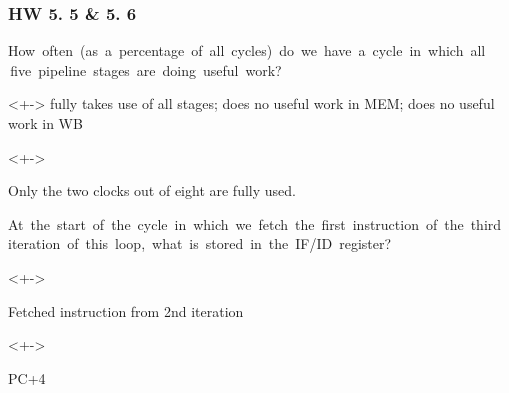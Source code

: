 \documentclass[xcolor=table]{beamer}
\begin{document}
\begin{mdframe}%

\frametitle{HW 5. 5 \& 5. 6}\label{heading-sec-hw-5-5-5-6}%

\noindent{} How  often  (as  a  percentage  of  all  cycles)  do  we  have  a  cycle  in  which  all  five  pipeline  stages  are  doing  useful  work?%

\mdhr{}%

\begin{onlyenv}<+->%
\noindent{} fully takes use of all stages;  does no useful work in MEM;  does no useful work in WB%
\end{onlyenv}%

\begin{onlyenv}<+->%
\begin{mdbmargintb}{}{}%
Only the two clocks out of eight are fully used.%
\end{mdbmargintb}%
\end{onlyenv}%

 At  the  start  of  the  cycle  in  which  we  fetch  the  first  instruction  of  the  third  iteration  of  this  loop,  what  is  stored  in  the  IF/ID  register?%

\mdhr{}%

\begin{itemize}[noitemsep,topsep=\mdcompacttopsep]%

\begin{onlyenv}<+->%
\item{}Fetched instruction from 2nd iteration 
\end{onlyenv}%

\begin{onlyenv}<+->%
\item{}PC+4
\end{onlyenv}%
\end{itemize}%
\end{mdframe}\label{sec-hw-5-5-5-6}%
\end{document}
